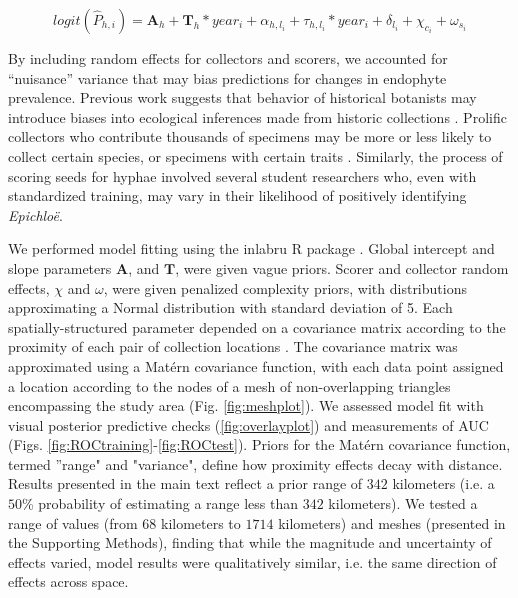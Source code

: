 \documentclass[11pt]{article}
\let\cite\citep
\begin{document}
\begin{equation}
	\label{eq:trends}
		logit(\hat{P}_{h,i}) = \boldsymbol{A}_{h} + \boldsymbol{T}_{h}*year_i  + \alpha_{h,l_{i}} + \tau_{h,l_i}*year_i + \delta_{l_i} + \chi_{c_i} + \omega_{s_i} 
\end{equation}

By including random effects for collectors and scorers, we accounted for ``nuisance'' variance that may bias predictions for changes in endophyte prevalence.
Previous work suggests that behavior of historical botanists may introduce biases into ecological inferences made from historic collections \cite{kozlov2020biases}. 
Prolific collectors who contribute thousands of specimens may be more or less likely to collect certain species, or specimens with certain traits \cite{daru2018widespread}. 
Similarly, the process of scoring seeds for hyphae involved several student researchers who, even with standardized training, may vary in their likelihood of positively identifying \emph{Epichloë}. 

We performed model fitting using the inlabru R package \citep{bachl2019inlabru}.
Global intercept and slope parameters $\boldsymbol{A}$, and $\boldsymbol{T}$, were given vague priors.
Scorer and collector random effects, $\chi$ and $\omega$, were given penalized complexity priors, with distributions approximating a Normal distribution with standard deviation of 5. 
Each spatially-structured parameter depended on a covariance matrix according to the proximity of each pair of collection locations \citep{lindgren2011explicit,bakka2018spatial}. 
The covariance matrix was approximated using a Mat\'{e}rn covariance function, with each data point assigned a location according to the nodes of a mesh of non-overlapping triangles encompassing the study area (Fig. \ref{fig:meshplot}).
We assessed model fit with visual posterior predictive checks (\ref{fig:overlayplot}) and measurements of AUC (Figs. \ref{fig:ROCtraining}-\ref{fig:ROCtest}).
Priors for the Mat\'{e}rn covariance function, termed ''range" and "variance", define how proximity effects decay with distance.
Results presented in the main text reflect a prior range of $342$ kilometers (i.e. a $50$\% probability of estimating a range less than $342$ kilometers). 
We tested a range of values (from $68$ kilometers to $1714$ kilometers) and meshes (presented in the Supporting Methods), finding that while the magnitude and uncertainty of effects varied, model results were qualitatively similar, i.e. the same direction of effects across space.
\end{document}
